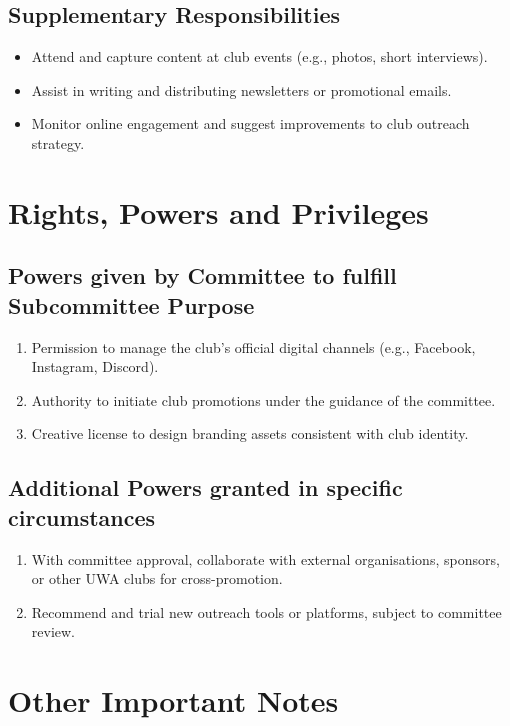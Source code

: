 \documentclass[10pt,a4paper]{report}
\begin{document}
		\section{Supplementary Responsibilities}
		\begin{itemize}
			\item Attend and capture content at club events (e.g., photos, short interviews).
			\item Assist in writing and distributing newsletters or promotional emails.
			\item Monitor online engagement and suggest improvements to club outreach strategy.
		\end{itemize}

	\chapter{Rights, Powers and Privileges}
		\section{Powers given by Committee to fulfill Subcommittee Purpose}
		\begin{enumerate}[label=\arabic*.]
			\item Permission to manage the club's official digital channels (e.g., Facebook, Instagram, Discord).
			\item Authority to initiate club promotions under the guidance of the committee.
			\item Creative license to design branding assets consistent with club identity.
		\end{enumerate}

		\section{Additional Powers granted in specific circumstances}
		\begin{enumerate}[label=\arabic*.]
			\item With committee approval, collaborate with external organisations, sponsors, or other UWA clubs for cross-promotion.
			\item Recommend and trial new outreach tools or platforms, subject to committee review.
		\end{enumerate}

	\chapter{Other Important Notes}
\end{document}
